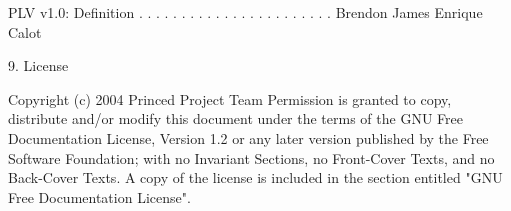  PLV v1.0:
  Definition . . . . . . . . . . . . . . . . . . . . . . .  Brendon James
                                                            Enrique Calot

9. License
   ~~~~~~~

      Copyright (c)  2004  Princed Project Team
      Permission is granted to copy, distribute and/or modify this document
      under the terms of the GNU Free Documentation License, Version 1.2
      or any later version published by the Free Software Foundation;
      with no Invariant Sections, no Front-Cover Texts, and no Back-Cover
      Texts.  A copy of the license is included in the section entitled
      "GNU Free Documentation License".

